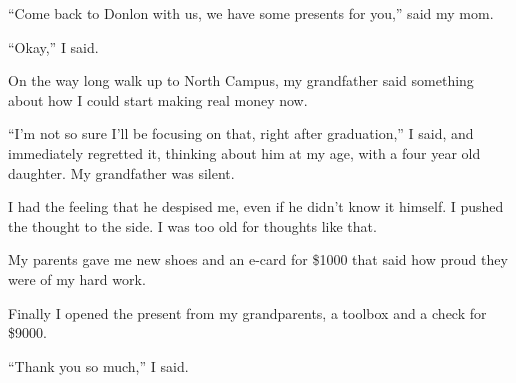 ``Come back to Donlon with us, we have some presents for you,'' said my mom. 

``Okay,'' I said.  

On the way long walk up to North Campus, my grandfather said something about how
I could start making real money now.

``I'm not so sure I'll be focusing on that, right after graduation,'' I said,
and immediately regretted it, thinking about him at my age, with a four year old
daughter.  My grandfather was silent.  

I had the feeling that he despised me, even if he didn't know it himself.  I
pushed the thought to the side.  I was too old for thoughts like that.

My parents gave me new shoes and an e-card for \$1000 that said how proud they
were of my hard work.  

Finally I opened the present from my grandparents, a toolbox and a check for \$9000.  

``Thank you so much,'' I said.
